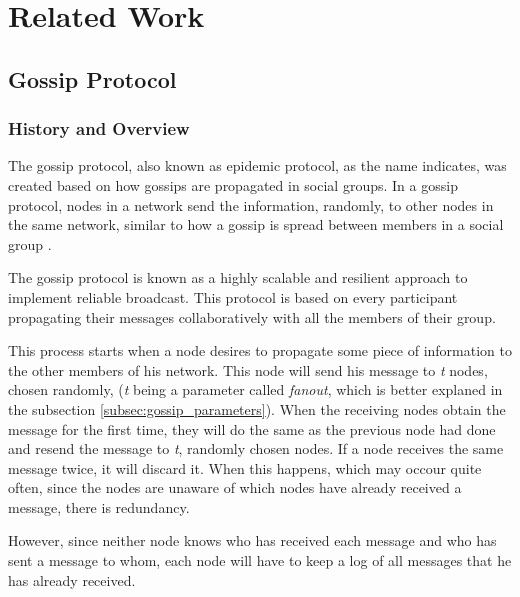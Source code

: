 
%

\chapter{Related Work}
\label{cha:related_work}

\section{Gossip Protocol}
\label{sec:gossip_protocol}

\subsection{History and Overview}
\label{subsec:gossip_history_overview}
The gossip protocol, also known as epidemic protocol, as the name indicates, was created
based on how gossips are propagated in social groups. In a gossip protocol, nodes in a
network send the information, randomly, to other nodes in the same network, similar to how a
gossip is spread between members in a social group \cite{Leitao2007}.

The gossip protocol is known as a highly scalable and resilient approach to implement
reliable broadcast. This protocol is based on every participant propagating their messages
collaboratively with all the members of their group.

This process starts when a node desires to propagate some piece of information to the
other members of his network. This node will send his message to \textit{t} nodes,
chosen randomly, (\textit{t} being a parameter called \textit{fanout}, which is better
explaned in the subsection \ref{subsec:gossip_parameters}). When the receiving nodes obtain the
message for the first time, they will do the same as the previous node had done and
resend the message to \textit{t}, randomly chosen nodes. If a node receives the same
message twice, it will discard it. When this happens, which may occour quite often,
since the nodes are unaware of which nodes have already received a message, there is
redundancy.

However, since neither node knows who has received each message and who has sent a
message to whom, each node will have to keep a log of all messages that he has already
received.

